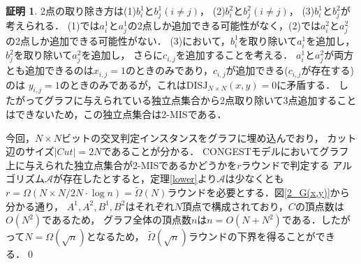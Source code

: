 \documentclass[12pt]{thesis}
\newcommand{\CONGEST}{\textsf{CONGEST}}
\theoremstyle{definition}
\newtheorem*{prf*}{証明}
\begin{document}
\begin{prf*}
2点の取り除き方は(1)$b_{i}^{1}$と$b_{j}^{1}(i \neq j)$， (2)$b_{i}^{2}$と$b_{j}^{2}(i \neq j)$， (3)$b_{i}^{1}$と$b_{j}^{2}$が考えられる．
(1)では$a_{i}^{1}$と$a_{j}^{1}$の2点しか追加できる可能性がなく，(2)では$a_{i}^{2}$と$a_{j}^{2}$の2点しか追加できる可能性がない．
(3)において，$b_{i}^{1}$を取り除いて$a_{i}^{1}$を追加し，$b_{j}^{2}$を取り除いて$a_{j}^{2}$を追加し，
さらに$c_{i, j}$を追加することを考える．
$a_{i}^{1}$と$a_{j}^{2}$が両方とも追加できるのは$x_{i, j} = 1$のときのみであり，$c_{i, j}$が追加できる($c_{i, j}$が存在する)のは
$y_{i, j} = 1$のときのみであるが，これは$\mathrm{DISJ}_{N \times N} (x, y) = 0$に矛盾する．
したがってグラフに与えられている独立点集合から2点取り除いて3点追加することはできないため，この独立点集合は2-MISである．

今回，$N \times N$ビットの交叉判定インスタンスをグラフに埋め込んでおり，
カット辺のサイズ$|\mathit{Cut}| = 2N$であることが分かる．
{\CONGEST}モデルにおいてグラフ上に与えられた独立点集合が2-MISであるかどうかを$r$ラウンドで判定する
アルゴリズム$\mathcal{A}$が存在したとすると，定理\ref{lower}より$\mathcal{A}$は少なくとも
$r = \Omega (N \times N/ 2N \cdot \log n) = \tilde{\Omega}(N)$ラウンドを必要とする．図\ref{2_G(x,y)}から分かる通り，
$A^{1}, A^{2}, B^{1}, B^{2}$はそれぞれ$N$頂点で構成されており，$C$の頂点数は$O(N^{2})$であるため，
グラフ全体の頂点数$n$は$n = O(N + N^{2})$である．したがって$N = \Omega(\sqrt{n})$となるため，
$\tilde{\Omega}(\sqrt{n})$ラウンドの下界を得ることができる．\qed
\end{prf*}
\newpage
\end{document}
